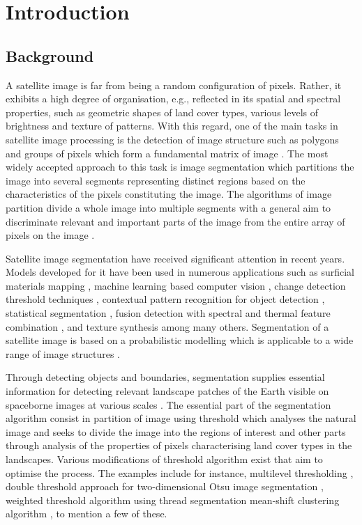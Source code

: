 \documentclass[analytics,article,submit,pdftex,moreauthors]{Definitions/mdpi}
\begin{document}
\section{Introduction}

\subsection{Background} 

A satellite image is far from being a random configuration of pixels. Rather, it exhibits a high degree of organisation, e.g., reflected in its spatial and spectral properties, such as geometric shapes of land cover types, various levels of brightness and texture of patterns. With this regard, one of the main tasks in satellite image processing is the detection of image structure such as polygons and groups of pixels which form a fundamental matrix of image \cite{Solomon}. The most widely accepted approach to this task is image segmentation which partitions the image into several segments representing distinct regions based on the characteristics of the pixels constituting the image. The algorithms of image partition divide a whole image into multiple segments with a general aim to discriminate relevant and important parts of the image from the entire array of pixels on the image \cite{LI202326,DONG2022109695,WANG2023110415}. 

Satellite image segmentation have received significant attention in recent years. Models developed for it have been used in numerous applications such as surficial materials mapping \cite{6947039}, machine learning based computer vision \cite{8914551}, change detection threshold techniques \cite{6005084}, contextual pattern recognition for object detection \cite{10006917,9719051,4284070}, statistical segmentation \cite{7730056,7877513}, fusion detection with spectral and thermal feature combination \cite{7730710}, and texture synthesis \cite{576322} among many others.
Segmentation of a satellite image is based on a probabilistic modelling which is applicable to a wide range of image structures \cite{Buscombe}. 

Through detecting objects and boundaries, segmentation supplies essential information for detecting relevant landscape patches of the Earth visible on spaceborne images at various scales \cite{Tzotsos}. The essential part of the segmentation algorithm consist in partition of image using threshold which analyses the natural image and seeks to divide the image into the regions of interest and other parts through analysis of the properties of pixels characterising land cover types in the landscapes. Various modifications of threshold algorithm exist that aim to optimise the process. The examples include for instance, multilevel thresholding \cite{9983775,8304271,8633236}, double threshold approach for two-dimensional Otsu image segmentation \cite{9421654,6066573}, weighted threshold algorithm using thread segmentation \cite{7493998} mean-shift clustering algorithm \cite{BARBATO2022100823}, to mention a few of these.
\end{document}
